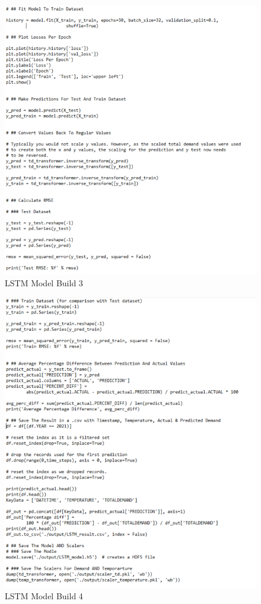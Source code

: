 \documentclass[mstat,12pt]{unswthesis}
\begin{document}
\begin{figure}[H]
\includegraphics{snapshots1/new LSTM_Build_Model_3.png}
\caption{LSTM Model Build 3}\label{ModelBuild3}
\end{figure}

\begin{figure}[H]
\includegraphics{snapshots1/new LSTM_Build_Model_4.png}
\caption{LSTM Model Build 4}\label{ModelBuild4}
\end{figure}
\end{document}
